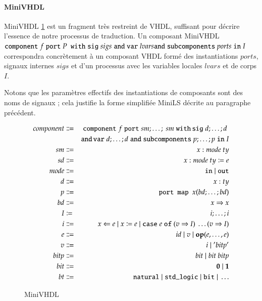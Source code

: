 \documentclass[9pt,a4paper]{article}
\newcommand{\p}[0]{\; \vert \;}
\newcommand{\mybox}[1]{\mbox{\tt{#1}}}
\newcommand{\Op}[2]{\mybox{\bf{op}}(#1,\dots,#2)}
\newcommand{\Component}[6]{\mybox{component} \; #1 \; \mybox{port} \; #2 \; \
  \mybox{with} \; \mybox{sig} \; #3 \; \mybox{and} \; \mybox{var} \; #4 \; \\
  \mybox{and} \; \mybox{subcomponents} \; #5 \; \mybox{in} \; #6}
\newcommand{\Assign}[2]{#1 \Leftarrow #2}
\newcommand{\Affect}[2]{#1 \coloneqq #2}
\newcommand{\Case}[5]{\mybox{case} \; #1 \; \mybox{of} \; (#2 \Rightarrow #3) \
  \dots (#4 \Rightarrow #5)}
\begin{document}
\paragraph{MiniVHDL}

MiniVHDL \ref{fig:mvhdl} est un fragment très restreint de VHDL, suffisant pour
décrire l'essence de notre processus de traduction. Un composant MiniVHDL
$\Component{f}{P}{sigs}{lvars}{ports}{I}$ correspondra concrètement à un
composant VHDL formé des instantiations $ports$, signaux internes $sigs$ et d'un
processus avec les variables locales $lvars$ et de corps $I$.

Notons que les paramètres effectifs des instantiations de composants sont des
noms de signaux ; cela justifie la forme simplifiée MiniLS décrite au paragraphe
précédent.

\begin{figure}[htp]
  \centering
  \begin{eqnarray*}
    component & \Coloneqq & \mybox{component} \; f \; \mybox{port} \; sm;\dots;\
    sm \; \mybox{with} \, \mybox{sig} \; d; \dots; d \; \\
    & & \mybox{and} \, \mybox{var} \; d; \dots; d \; \mybox{and} \
    \mybox{subcomponents} \; p; \dots; p \; \mybox{in} \; I \\
    sm & \Coloneqq & x : mode \ ty \\
    sd & \Coloneqq & x : mode \ ty \coloneqq e \\
    mode & \Coloneqq & \mybox{in} \p \mybox{out} \\
    d & \Coloneqq & x : ty \\
    p & \Coloneqq & \mybox{port map } x (bd;\dots;bd) \\
    bd & \Coloneqq & x \Rightarrow x \\
    I & \coloneqq & i; \dots; i \\
    i & \Coloneqq & \Assign{x}{e} \p \Affect{x}{e} \p \Case{e}{v}{I}{v}{I} \\
    e & \Coloneqq & id \; \vert \; v \; \vert \; \Op{e}{e} \\
    v & \Coloneqq & i \; \vert \; ' bitp ' \\
    bitp & \Coloneqq & bit \p bit \  bitp \\
    bit & \Coloneqq & \mathbf{0} \p \mathbf{1} \\
    bt & \Coloneqq & \mybox{natural} \p \mybox{std\_logic} \p \mybox{bit}
    \p \dots
  \end{eqnarray*}
  \caption{MiniVHDL}
  \label{fig:mvhdl}
\end{figure}
\end{document}
